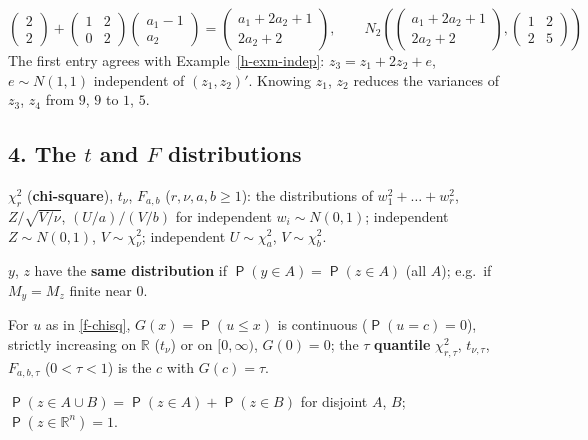 \documentclass[12pt]{article}
\newcommand{\R}{\mathbb R}
\DeclareMathOperator\prb{\mathsf{P}}
\theoremstyle{definition}
\begin{document}
\begin{board}[The conditional mean (Theorem~\ref{h-thm-conditional}), \(\mu_1=(1,0)'\), \(\mu_2=(2,2)'\):]
\[
\begin{pmatrix}2\\2\end{pmatrix}+\begin{pmatrix}1&2\\0&2\end{pmatrix}\begin{pmatrix}a_1-1\\a_2\end{pmatrix}
=\begin{pmatrix}a_1+2a_2+1\\2a_2+2\end{pmatrix},\qquad
N_2\left(\begin{pmatrix}a_1+2a_2+1\\2a_2+2\end{pmatrix},\begin{pmatrix}1&2\\2&5\end{pmatrix}\right)
\]
The first entry agrees with Example~\ref{h-exm-indep}: \(z_3=z_1+2z_2+e\), \(e\sim N(1,1)\) independent of
\((z_1,z_2)'\). Knowing \(z_1\), \(z_2\) reduces the variances of \(z_3\), \(z_4\) from \(9\), \(9\) to \(1\), \(5\).
\end{board}

\subsection*{4. The \(t\) and \(F\) distributions}

\begin{facts}[start=6]
\item\label{f-chisq} \(\chi^2_r\) (\textbf{chi-square}), \(t_\nu\), \(F_{a,b}\) (\(r,\nu,a,b\geqslant1\)): the
distributions of \(w_1^2+\dots+w_r^2\), \(Z/\sqrt{V/\nu}\), \((U/a)/(V/b)\) for independent \(w_i\sim N(0,1)\);
independent \(Z\sim N(0,1)\), \(V\sim\chi^2_\nu\); independent \(U\sim\chi^2_a\), \(V\sim\chi^2_b\).
\item\label{f-same} \(y\), \(z\) have the \textbf{same distribution} if \(\prb(y\in A)=\prb(z\in A)\) (all \(A\)); e.g.\
if \(M_y=M_z\) finite near \(0\).
\item\label{f-quantile} For \(u\) as in \ref{f-chisq}, \(G(x)=\prb(u\leqslant x)\) is continuous (\(\prb(u=c)=0\)),
strictly increasing on \(\R\) (\(t_\nu\)) or on \([0,\infty)\), \(G(0)=0\); the \(\tau\) \textbf{quantile}
\(\chi^2_{r,\tau}\), \(t_{\nu,\tau}\), \(F_{a,b,\tau}\) (\(0<\tau<1\)) is the \(c\) with \(G(c)=\tau\).
\item\label{f-add} \(\prb(z\in A\cup B)=\prb(z\in A)+\prb(z\in B)\) for disjoint \(A\), \(B\); \(\prb(z\in\R^n)=1\).
\end{facts}
\end{document}
